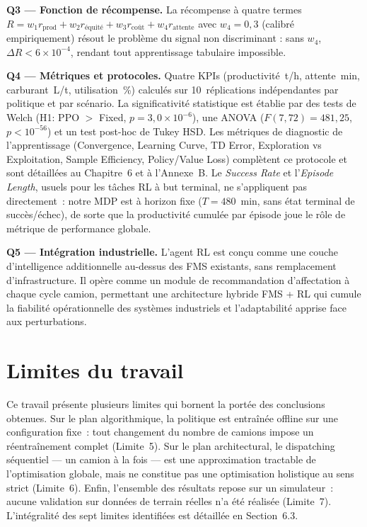\documentclass[11pt,a4paper]{report}
\begin{document}
\textbf{Q3 — Fonction de récompense.}
La récompense à quatre termes $R = w_1 r_{\text{prod}} + w_2
r_{\text{équité}} + w_3 r_{\text{coût}} + w_4 r_{\text{attente}}$
avec $w_4 = 0{,}3$ (calibré empiriquement) résout le problème
du signal non discriminant : sans $w_4$, $\Delta R < 6 \times 10^{-4}$,
rendant tout apprentissage tabulaire impossible.

\textbf{Q4 — Métriques et protocoles.}
Quatre KPIs (productivité~t/h, attente~min, carburant~L/t,
utilisation~\%) calculés sur 10~réplications indépendantes par
politique et par scénario. La significativité statistique est
établie par des tests de Welch (H1: PPO $> $ Fixed, $p = 3{,}0
\times 10^{-6}$), une ANOVA ($F(7,72) = 481{,}25$, $p < 10^{-56}$)
et un test post-hoc de Tukey HSD. Les métriques de diagnostic de
l'apprentissage (Convergence, Learning Curve, TD Error, Exploration
vs Exploitation, Sample Efficiency, Policy/Value Loss) complètent ce
protocole et sont détaillées au Chapitre~6 et à l'Annexe~B. Le \textit{Success
Rate} et l'\textit{Episode Length}, usuels pour les tâches RL à but
terminal, ne s'appliquent pas directement~: notre MDP est à horizon
fixe ($T = 480$~min, sans état terminal de succès/échec), de sorte
que la productivité cumulée par épisode joue le rôle de métrique de
performance globale.

\textbf{Q5 — Intégration industrielle.}
L'agent RL est conçu comme une couche d'intelligence additionnelle
au-dessus des FMS existants, sans remplacement d'infrastructure.
Il opère comme un module de recommandation d'affectation à chaque
cycle camion, permettant une architecture hybride FMS + RL qui
cumule la fiabilité opérationnelle des systèmes industriels et
l'adaptabilité apprise face aux perturbations.

\section*{Limites du travail}

Ce travail présente plusieurs limites qui bornent la portée des conclusions obtenues. Sur le plan algorithmique, la politique est entraînée offline sur une configuration fixe~: tout changement du nombre de camions impose un réentraînement complet (Limite~5). Sur le plan architectural, le dispatching séquentiel --- un camion à la fois --- est une approximation tractable de l'optimisation globale, mais ne constitue pas une optimisation holistique au sens strict (Limite~6). Enfin, l'ensemble des résultats repose sur un simulateur~: aucune validation sur données de terrain réelles n'a été réalisée (Limite~7). L'intégralité des sept limites identifiées est détaillée en Section~6.3.
\end{document}
